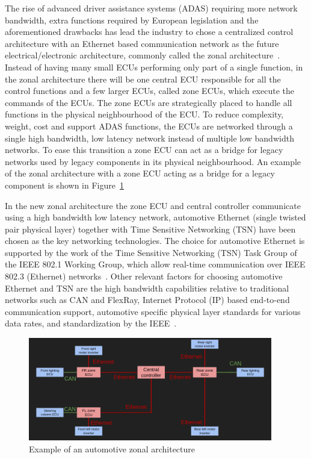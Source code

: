 The rise of advanced driver assistance systems (ADAS) requiring more network bandwidth, extra functions required by European legislation and the aforementioned drawbacks has lead the industry to chose a centralized control architecture with an Ethernet based communication network as the future electrical/electronic architecture, commonly called the zonal architecture~\cite{ashjaei2021time}. Instead of having many small ECUs performing only part of a single function, in the zonal architecture there will be one central ECU responsible for all the control functions and a few larger ECUs, called zone ECUs, which execute the commands of the ECUs. The zone ECUs are strategically placed to handle all functions in the physical neighbourhood of the ECU. To reduce complexity, weight, cost and support ADAS functions, the ECUs are networked through a single high bandwidth, low latency network instead of multiple low bandwidth networks. To ease this transition a zone ECU can act as a bridge for legacy networks used by legacy components in its physical neighbourhood. An example of the zonal architecture with a zone ECU acting as a bridge for a legacy component is shown in Figure~\ref{fig:zonal-arch}

In the new zonal architecture the zone ECU and central controller communicate using a high bandwidth low latency network, automotive Ethernet (single twisted pair physical layer) together with Time Sensitive Networking (TSN) have been chosen as the key networking technologies. The choice for automotive Ethernet is supported by the work of the Time Sensitive Networking (TSN) Task Group of the IEEE 802.1 Working Group, which allow real-time communication over IEEE 802.3 (Ethernet) networks~\cite{klaus2019zonal}. Other relevant factors for choosing automotive Ethernet and TSN are the high bandwidth capabilities relative to traditional networks such as CAN and FlexRay, Internet Protocol (IP) based end-to-end communication support, automotive specific physical layer standards for various data rates, and standardization by the IEEE~\cite{ashjaei2021time}.

\begin{figure}[htb]
    \centering
    \includegraphics[width=0.95\textwidth]{images/zone-arch.png}
    \caption{Example of an automotive zonal architecture}
    \label{fig:zonal-arch}
\end{figure}


